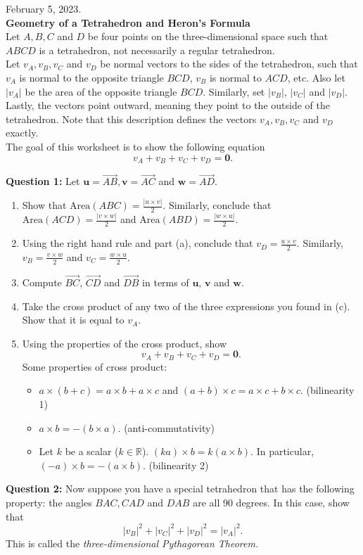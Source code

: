 February 5, 2023.\\

\textbf{Geometry of a Tetrahedron and Heron's Formula}\\

Let $A,B,C$ and $D$ be four points on the three-dimensional space such that $ABCD$ is a tetrahedron, not necessarily a regular tetrahedron. \\

Let  $v_A, v_B, v_C$ and $v_D$ be normal vectors to the sides of the tetrahedron, such that $v_A$ is normal to the opposite triangle $BCD$, $v_B$ is normal to $ACD$, etc. Also let $|v_A|$ be the area of the opposite triangle $BCD$. Similarly, set $|v_B|$, $|v_C|$ and $|v_D|$. Lastly, the vectors point outward, meaning they point to the outside of the tetrahedron. Note that this description defines the vectors $v_A, v_B, v_C$ and $v_D$ exactly.\\

The goal of this worksheet is to show the following equation $$v_A+v_B+v_C+v_D = \textbf{0}.$$

\textbf{Question 1:} Let $\textbf{u} = \overset{\rightarrow}{AB}, \textbf{v} = \overset{\rightarrow}{AC}$ and $\textbf{w} = \overset{\rightarrow}{AD}.$ 
\begin{enumerate}[label=(\alph*)]
    \item Show that $\textrm{Area}(ABC) = \frac{|u\times v|}{2}$. Similarly, conclude that $\textrm{Area}(ACD) = \frac{|v\times w|}{2}$ and $\textrm{Area}(ABD) = \frac{|w\times u|}{2}$.
    \item Using the right hand rule and part (a), conclude that $v_D = \frac{u\times v}{2}$. Similarly, $v_B = \frac{v\times w}{2}$ and $v_C = \frac{w\times u}{2}$.
    \item Compute $\overset{\rightarrow}{BC}$, $\overset{\rightarrow}{CD}$ and $\overset{\rightarrow}{DB}$ in terms of $\textbf{u}$, $\textbf{v}$ and $\textbf{w}$.
    \item Take the cross product of any two of the three expressions you found in (c). Show that it is equal to $v_A.$
    \item Using the properties of the cross product, show $$v_A + v_B + v_C + v_D = \textbf{0}.$$ Some properties of cross product:
    \begin{itemize}
        \item $a\times (b+c) = a\times b + a\times c$ and $(a+b) \times c = a\times c + b\times c.$ (bilinearity 1) 
        \item $a\times b = - (b\times a).$ (anti-commutativity)
        \item Let $k$ be a scalar ($k\in \mathbb{R}$). $(ka) \times b = k(a\times b).$ In particular, $(-a)\times b = -(a\times b).$ (bilinearity 2)
    \end{itemize}
\end{enumerate}

\textbf{Question 2:} Now suppose you have a special tetrahedron that has the following property: the angles $BAC, CAD$ and $DAB$ are all 90 degrees. In this case, show that $$|v_B|^2+|v_C|^2+|v_D|^2 = |v_A|^2.$$ This is called the \textit{three-dimensional Pythagorean Theorem.}
